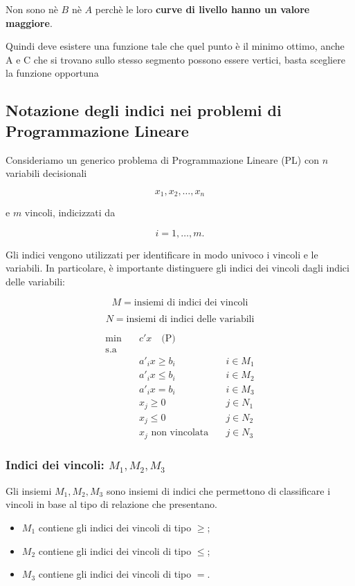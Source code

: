 Non sono nè \(B\) nè \(A\) perchè le loro \textbf{curve di livello hanno un valore maggiore}.

Quindi deve esistere una funzione tale che quel punto è il minimo ottimo, anche A e C che si trovano sullo stesso segmento possono essere vertici, basta scegliere la funzione opportuna

\subsection*{Notazione degli indici nei problemi di Programmazione Lineare}

Consideriamo un generico problema di Programmazione Lineare (PL) con
$n$ variabili decisionali

\[
x_1,x_2,\ldots,x_n
\]

e $m$ vincoli, indicizzati da

\[
i=1,\ldots,m.
\]

Gli indici vengono utilizzati per identificare in modo univoco i
vincoli e le variabili. In particolare, è importante distinguere gli
indici dei vincoli dagli indici delle variabili:

\[
\boxed{M=\text{insiemi di indici dei vincoli}}
\]

\[
\boxed{N=\text{insiemi di indici delle variabili}}
\]

\[
\begin{aligned}
\min \quad & c'x \quad \text{(P)} \\
\text{s.a} \quad & \\
& a'_i x \ge b_i \quad & i \in M_1 \\
& a'_i x \le b_i \quad & i \in M_2 \\
& a'_i x = b_i \quad & i \in M_3 \\
& x_j \ge 0 \quad & j \in N_1 \\
& x_j \le 0 \quad & j \in N_2 \\
& x_j \text{ non vincolata} \quad & j \in N_3
\end{aligned}
\]

\subsubsection*{Indici dei vincoli: $M_1,M_2,M_3$}

Gli insiemi $M_1,M_2,M_3$ sono insiemi di indici che permettono di
classificare i vincoli in base al tipo di relazione che presentano.

\begin{itemize}
    \item $M_1$ contiene gli indici dei vincoli di tipo $\ge$;
    \item $M_2$ contiene gli indici dei vincoli di tipo $\le$;
    \item $M_3$ contiene gli indici dei vincoli di tipo $=$.
\end{itemize}

